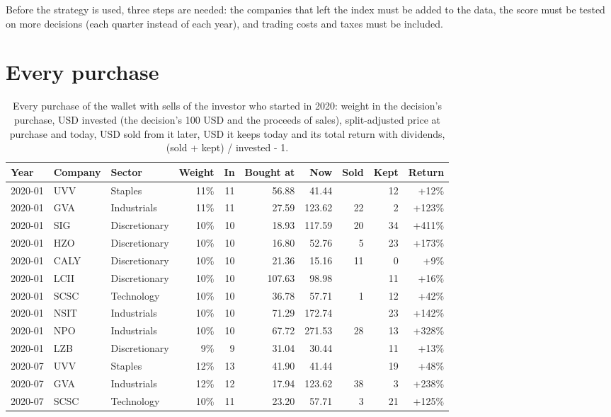 \documentclass[11pt,a4paper]{article}
\begin{document}
Before the strategy is used, three steps are needed: the companies that left the index must be added to the data, the score must be tested on more decisions (each quarter instead of each year), and trading costs and taxes must be included.

\newpage
\appendix
\section{Every purchase}
\label{app:purchases}
{\small
\begin{longtable}{l l l r r r r r r r}
\caption{Every purchase of the wallet with sells of the investor who started in 2020: weight in the decision's purchase, USD invested (the decision's 100 USD and the proceeds of sales), split-adjusted price at purchase and today, USD sold from it later, USD it keeps today and its total return with dividends, (sold + kept) / invested - 1.}\label{tab:purchases}\\
\hline
Year & Company & Sector & Weight & In & Bought at & Now & Sold & Kept & Return \\
\hline
\endhead
2020-01 & UVV & Staples & 11\% & 11 & 56.88 & 41.44 &  & 12 & +12\% \\
2020-01 & GVA & Industrials & 11\% & 11 & 27.59 & 123.62 & 22 & 2 & +123\% \\
2020-01 & SIG & Discretionary & 10\% & 10 & 18.93 & 117.59 & 20 & 34 & +411\% \\
2020-01 & HZO & Discretionary & 10\% & 10 & 16.80 & 52.76 & 5 & 23 & +173\% \\
2020-01 & CALY & Discretionary & 10\% & 10 & 21.36 & 15.16 & 11 & 0 & +9\% \\
2020-01 & LCII & Discretionary & 10\% & 10 & 107.63 & 98.98 &  & 11 & +16\% \\
2020-01 & SCSC & Technology & 10\% & 10 & 36.78 & 57.71 & 1 & 12 & +42\% \\
2020-01 & NSIT & Industrials & 10\% & 10 & 71.29 & 172.74 &  & 23 & +142\% \\
2020-01 & NPO & Industrials & 10\% & 10 & 67.72 & 271.53 & 28 & 13 & +328\% \\
2020-01 & LZB & Discretionary & 9\% & 9 & 31.04 & 30.44 &  & 11 & +13\% \\
2020-07 & UVV & Staples & 12\% & 13 & 41.90 & 41.44 &  & 19 & +48\% \\
2020-07 & GVA & Industrials & 12\% & 12 & 17.94 & 123.62 & 38 & 3 & +238\% \\
2020-07 & SCSC & Technology & 10\% & 11 & 23.20 & 57.71 & 3 & 21 & +125\% \\

\end{longtable}}
\end{document}
